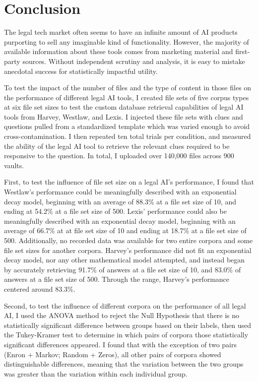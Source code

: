 \documentclass[
]{article}
\begin{document}
\section{Conclusion}\label{conclusion}

The legal tech market often seems to have an infinite amount of AI products purporting to sell any imaginable kind of functionality. However, the majority of available information about these tools comes from marketing material and first-party sources. Without independent scrutiny and analysis, it is easy to mistake anecdotal success for statistically impactful utility.

To test the impact of the number of files and the type of content in those files on the performance of different legal AI tools, I created file sets of five corpus types at six file set sizes to test the custom database retrieval capabilities of legal AI tools from Harvey, Westlaw, and Lexis. I injected these file sets with clues and questions pulled from a standardized template which was varied enough to avoid cross-contamination. I then repeated ten total trials per condition, and measured the ability of the legal AI tool to retrieve the relevant clues required to be responsive to the question. In total, I uploaded over 140,000 files across 900 vaults.

First, to test the influence of file set size on a legal AI's performance, I found that Westlaw's performance could be meaningfully described with an exponential decay model, beginning with an average of 88.3\% at a file set size of 10, and ending at 54.2\% at a file set size of 500. Lexis' performance could also be meaningfully described with an exponential decay model, beginning with an average of 66.7\% at at file set size of 10 and ending at 18.7\% at a file set size of 500. Additionally, no recorded data was available for two entire corpora and some file set sizes for another corpora. Harvey's performance did not fit an exponential decay model, nor any other mathematical model attempted, and instead began by accurately retrieving 91.7\% of answers at a file set size of 10, and 83.0\% of answers at a file set size of 500. Through the range, Harvey's performance centered around 83.3\%.

Second, to test the influence of different corpora on the performance of all legal AI, I used the ANOVA method to reject the Null Hypothesis that there is no statistically significant difference between groups based on their labels, then used the Tukey-Kramer test to determine in which pairs of corpora those statistically significant differences appeared. I found that with the exception of two pairs (Enron + Markov; Random + Zeros), all other pairs of corpora showed distinguishable differences, meaning that the variation between the two groups was greater than the variation within each individual group.
\end{document}

